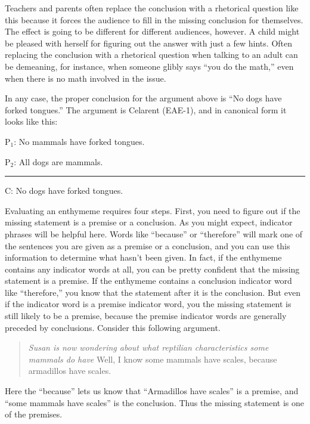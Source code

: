 {Teachers and parents often replace the conclusion with a rhetorical question like this because it forces the audience to fill in the missing conclusion for themselves. The effect is going to be different for different audiences, however. A child might be pleased with herself for figuring out the answer with just a few hints. Often replacing the conclusion with a rhetorical question when talking to an adult can be demeaning, for instance, when someone glibly says ``you do the math,'' even when there is no math involved in the issue. 

In any case, the proper conclusion for the argument above is ``No dogs have forked tongues.'' The argument is Celarent (EAE-1), and in canonical form it looks like this: 

\begin{earg}
\item[P$_1$:] No mammals have forked tongues.
\item[P$_2$:] All dogs are mammals.
\vspace{-.5em}
\item [] \rule{0.4\linewidth}{.5pt} 
\item[C:] No dogs have forked tongues. 
\end{earg} 


Evaluating an enthymeme requires four steps. First, you need to figure out if the missing statement is a premise or a conclusion. As you might expect, indicator phrases will be helpful here. Words like ``because'' or ``therefore'' will mark one of the sentences you are given as a premise or a conclusion, and you can use this information to determine what hasn't been given. In fact, if the enthymeme contains any indicator words at all, you can be pretty confident that the missing statement is a premise. If the enthymeme contains a conclusion indicator word like ``therefore,'' you know that the statement after it is the conclusion. But even if the indicator word is a premise indicator word, you the missing statement is still likely to be a premise, because the premise indicator words are generally preceded by conclusions. Consider this following argument. 

\begin{quotation} \noindent\textit{Susan is now wondering about what reptilian characteristics some mammals do have} Well, I know some mammals have scales, because armadillos have scales. \end{quotation}

 Here the ``because'' lets us know that  ``Armadillos have scales'' is a premise, and ``some mammals have scales'' is the conclusion. Thus the missing statement is one of the premises. 

}
